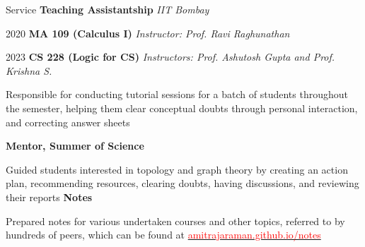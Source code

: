 
\begin{rubric}{Service}
    \entry* \textbf{Teaching Assistantship} \hfill \emph{IIT Bombay}

       2020 \quad \textbf{MA 109 (Calculus I)} \hfill \emph{Instructor: Prof. Ravi Raghunathan}

       2023 \quad \textbf{CS 228 (Logic for CS)} \hfill  \emph{Instructors: Prof. Ashutosh Gupta and Prof. Krishna S.}

	    Responsible for conducting tutorial sessions for a batch of students throughout the semester, helping them clear conceptual doubts through personal interaction, and correcting answer sheets

	\entry*[2021--2022] \textbf{Mentor, Summer of Science}

		Guided students interested in topology and graph theory by creating an action plan, recommending resources, clearing doubts, having discussions, and reviewing their reports
	\entry*[2020--Present] \textbf{Notes}

		Prepared notes for various undertaken courses and other topics, referred to by hundreds of peers, which can be found at \href{https://amitrajaraman.github.io/notes}{\textcolor{red}{amitrajaraman.github.io/notes}}
\end{rubric}